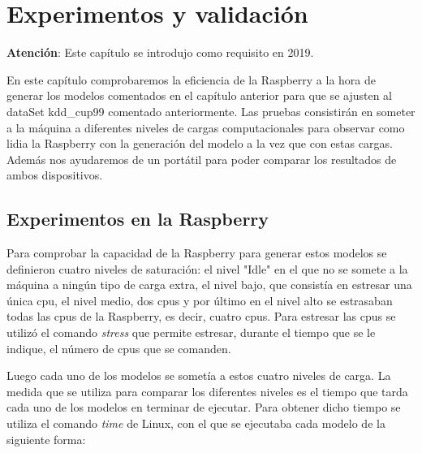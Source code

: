 \documentclass[a4paper, 12pt]{book}
\begin{document}
\cleardoublepage


\chapter{Experimentos y validación}
\label{chap:experimentos}

\textbf{Atención}: Este capítulo se introdujo como requisito en 2019.

En este capítulo comprobaremos la eficiencia de la Raspberry a la hora de generar los modelos comentados en el capítulo anterior para que se ajusten al dataSet kdd\_cup99 comentado anteriormente. Las pruebas consistirán en someter a la máquina a diferentes niveles de cargas computacionales para observar como lidia la Raspberry con la generación del modelo a la vez que con estas cargas.
Además nos ayudaremos de un portátil para poder comparar los resultados de ambos dispositivos.

\section{Experimentos en la Raspberry}
\label{sec:experimentos_en_raspberry}

Para comprobar la capacidad de la Raspberry para generar estos modelos se definieron cuatro niveles de saturación: el nivel "Idle" en el que no se somete a la máquina a ningún tipo de carga extra, el nivel bajo, que consistía en estresar una única cpu, el nivel medio, dos cpus y por último en el nivel alto se estrasaban todas las cpus de la Raspberry, es decir, cuatro cpus. 
Para estresar las cpus se utilizó el comando \textit{stress} que permite estresar, durante el tiempo que se le indique, el número de cpus que se comanden.

Luego cada uno de los modelos se sometía a estos cuatro niveles de carga. La medida que se utiliza para comparar los diferentes niveles es el tiempo que tarda cada uno de los modelos en terminar de ejecutar. Para obtener dicho tiempo se utiliza el comando \textit{time} de Linux, con el que se ejecutaba cada modelo de la siguiente forma:\\
\end{document}
